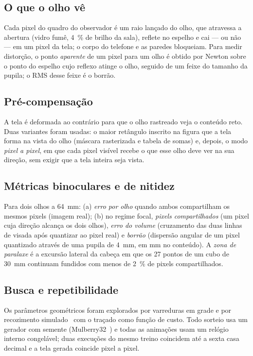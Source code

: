 \documentclass[journal,10pt]{IEEEtran}
\begin{document}
\subsection{O que o olho v\^e}
Cada pixel do quadro do observador \'e um raio lan\c{c}ado do olho, que atravessa a abertura (vidro fum\^e, 4~\% de brilho da sala), reflete no espelho e cai --- ou n\~ao --- em um pixel da tela; o corpo do telefone e as paredes bloqueiam. Para medir distor\c{c}\~ao, o ponto \emph{aparente} de um pixel para um olho \'e obtido por Newton sobre o ponto do espelho cujo reflexo atinge o olho, seguido de um feixe do tamanho da pupila; o RMS desse feixe \'e o borr\~ao.

\subsection{Pr\'e-compensa\c{c}\~ao}
A tela \'e deformada ao contr\'ario para que o olho rastreado veja o conte\'udo reto. Duas variantes foram usadas: o maior ret\^angulo inscrito na figura que a tela forma na vista do olho (m\'ascara rasterizada e tabela de somas) e, depois, o modo \emph{pixel a pixel}, em que cada pixel vis\'ivel recebe o que esse olho deve ver na sua dire\c{c}\~ao, sem exigir que a tela inteira seja vista.

\subsection{M\'etricas binoculares e de nitidez}
Para dois olhos a 64~mm: (a) \emph{erro por olho} quando ambos compartilham os mesmos pixels (imagem real); (b) no regime focal, \emph{pixels compartilhados} (um pixel cuja dire\c{c}\~ao alcan\c{c}a os dois olhos), \emph{erro do volume} (cruzamento das duas linhas de visada ap\'os quantizar ao pixel real) e \emph{borr\~ao} (dispers\~ao angular de um pixel quantizado atrav\'es de uma pupila de 4~mm, em mm no conte\'udo). A \emph{zona de paralaxe} \'e a excurs\~ao lateral da cabe\c{c}a em que os 27 pontos de um cubo de 30~mm continuam fundidos com menos de 2~\% de pixels compartilhados.

\subsection{Busca e repetibilidade}
Os par\^ametros geom\'etricos foram explorados por varreduras em grade e por recozimento simulado~\cite{kirkpatrick1983} com o tra\c{c}ado como fun\c{c}\~ao de custo. Todo sorteio usa um gerador com semente (Mulberry32~\cite{mulberry32}) e todas as anima\c{c}\~oes usam um rel\'ogio interno congel\'avel; duas execu\c{c}\~oes do mesmo treino coincidem at\'e a sexta casa decimal e a tela gerada coincide pixel a pixel.
\end{document}
